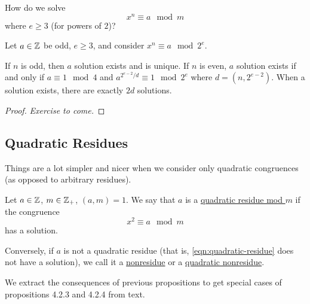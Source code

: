 \begin{ques*}
    How do we solve
    \[x^n\equiv a\mod m\]
    where $e\geq 3$ (for powers of $2$)?
\end{ques*}
\begin{proposition}
    Let $a\in\mathbb Z$ be odd, $e\geq 3$, and consider $x^n\equiv a\mod 2^e$.

    If $n$ is odd, then $a$ solution exists and is unique. If $n$ is even, $a$ solution exists if and only if $a\equiv 1\mod 4$ and $a^{2^{e-2}/d}\equiv 1\mod 2^e$ where $d = (n, 2^{e-2})$. When a solution exists, there are exactly $2d$ solutions.
\end{proposition}
\begin{proof}
    \emph{Exercise to come.}
\end{proof}

\subsection{Quadratic Residues}
Things are a lot simpler and nicer when we consider only quadratic congruences (as opposed to arbitrary residues).
\begin{definition}
    Let $a\in\mathbb Z$, $m\in\mathbb Z_+$, $(a, m) = 1$. We say that $a$ is a \ul{quadratic residue mod $m$} if the congruence
    \begin{equation}\label{eqn:quadratic-residue}x^2\equiv a\mod m\end{equation}
    has a solution.
\end{definition}

Conversely, if $a$ is not a quadratic residue (that is, \cref{eqn:quadratic-residue} does not have a solution), we call it a \ul{nonresidue} or a \ul{quadratic nonresidue}.

We extract the consequences of previous propositions to get special cases of propositions 4.2.3 and 4.2.4 from text.

